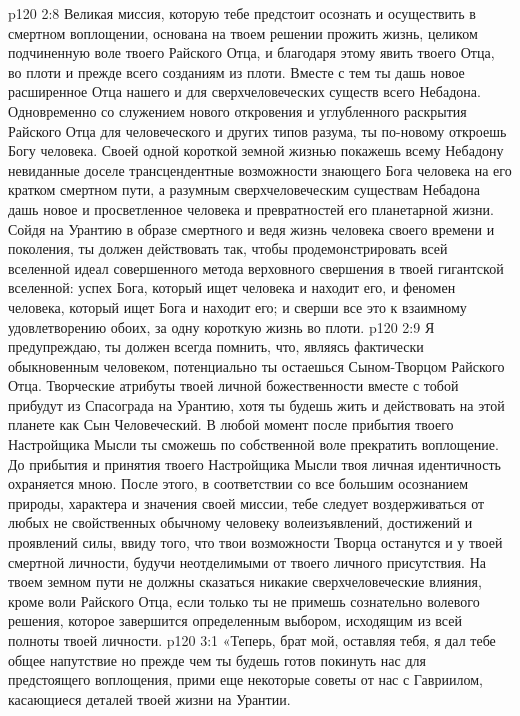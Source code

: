 \vs p120 2:8 \bibnobreakspace Великая миссия, которую тебе предстоит осознать и осуществить в смертном воплощении, основана на твоем решении прожить жизнь, целиком подчиненную воле твоего Райского Отца, и благодаря этому явить  твоего Отца, во плоти и прежде всего созданиям из плоти. Вместе с тем ты дашь новое расширенное  Отца нашего и для сверхчеловеческих существ всего Небадона. Одновременно со служением нового откровения и углубленного раскрытия Райского Отца для человеческого и других типов разума, ты по\hyp{}новому откроешь Богу человека. Своей одной короткой земной жизнью покажешь всему Небадону невиданные доселе трансцендентные возможности знающего Бога человека на его кратком смертном пути, а разумным сверхчеловеческим существам Небадона дашь новое и просветленное  человека и превратностей его планетарной жизни. Сойдя на Урантию в образе смертного и ведя жизнь человека своего времени и поколения, ты должен действовать так, чтобы продемонстрировать всей вселенной идеал совершенного метода верховного свершения в твоей гигантской вселенной: успех Бога, который ищет человека и находит его, и феномен человека, который ищет Бога и находит его; и сверши все это к взаимному удовлетворению обоих, за одну короткую жизнь во плоти.
\vs p120 2:9 \bibnobreakspace Я предупреждаю, ты должен всегда помнить, что, являясь фактически обыкновенным человеком, потенциально ты остаешься Сыном\hyp{}Творцом Райского Отца. Творческие атрибуты твоей личной божественности вместе с тобой прибудут из Спасограда на Урантию, хотя ты будешь жить и действовать на этой планете как Сын Человеческий. В любой момент после прибытия твоего Настройщика Мысли ты сможешь по собственной воле прекратить воплощение. До прибытия и принятия твоего Настройщика Мысли твоя личная идентичность охраняется мною. После этого, в соответствии со все большим осознанием природы, характера и значения своей миссии, тебе следует воздерживаться от любых не свойственных обычному человеку волеизъявлений, достижений и проявлений силы, ввиду того, что твои возможности Творца останутся и у твоей смертной личности, будучи неотделимыми от твоего личного присутствия. На твоем земном пути не должны сказаться никакие сверхчеловеческие влияния, кроме воли Райского Отца, если только ты не примешь сознательно волевого решения, которое завершится определенным выбором, исходящим из всей полноты твоей личности.
\vs p120 3:1 «Теперь, брат мой, оставляя тебя, я дал тебе общее напутствие но прежде чем ты будешь готов покинуть нас для предстоящего воплощения, прими еще некоторые советы от нас с Гавриилом, касающиеся деталей твоей жизни на Урантии.

